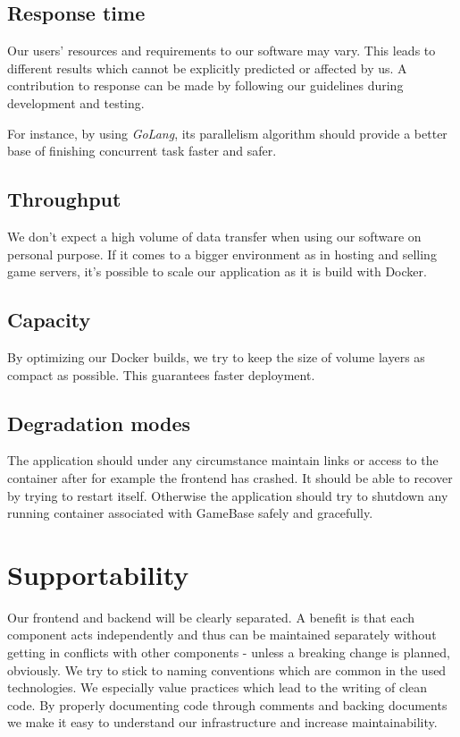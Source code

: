 \documentclass[a4paper,12pt,chapterprefix=false,bibliography=totoc,listof=totoc,]{scrreprt}
\begin{document}
\subsection{Response time}
Our users' resources and requirements to our software may vary. This leads to different results which cannot be explicitly predicted or affected by us. A contribution to response can be made by following our guidelines during development and testing.

For instance, by using \emph{GoLang}, its parallelism algorithm should provide a better base of finishing concurrent task faster and safer.

\subsection{Throughput}
We don't expect a high volume of data transfer when using our software on personal purpose. If it comes to a bigger environment as in hosting and selling game servers, it's possible to scale our application as it is build with Docker. 


\subsection{Capacity}
By optimizing our Docker builds, we try to keep the size of volume layers as compact as possible. This guarantees faster deployment.


\subsection{Degradation modes}
The application should under any circumstance maintain links or access to the container after for example the frontend has crashed. It should be able to recover by trying to restart itself. Otherwise the application should try to shutdown any running container associated with GameBase safely and gracefully. 


\section{Supportability}
Our frontend and backend will be clearly separated. A benefit is that each component acts independently and thus can be maintained separately without getting in conflicts with other components - unless a breaking change is planned, obviously. We try to stick to naming conventions which are common in the used technologies. We especially value practices which lead to the writing of clean code. By properly documenting code through comments and backing documents we make it easy to understand our infrastructure and increase maintainability.
\end{document}
